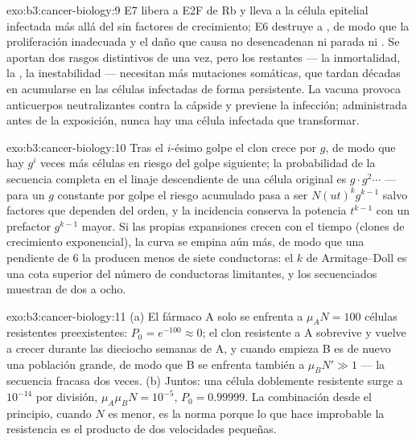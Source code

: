 \begin{solution}{exo:b3:cancer-biology:9}
E7 libera a E2F de Rb y lleva a la célula epitelial infectada más allá
del  sin factores de crecimiento; E6 destruye a ,
de modo que la proliferación inadecuada y el daño que causa no
desencadenan ni parada ni . Se aportan dos rasgos distintivos de
una vez, pero los restantes --- la inmortalidad, la , la
inestabilidad --- necesitan más mutaciones somáticas, que tardan décadas
en acumularse en las células infectadas de forma persistente. La vacuna
provoca anticuerpos neutralizantes contra la cápside y previene la
infección; administrada antes de la exposición, nunca hay una célula
infectada que transformar.
\end{solution}

\begin{solution}{exo:b3:cancer-biology:10}
Tras el $i$-ésimo golpe el clon crece por $g$, de modo que hay $g^{i}$
veces más células en riesgo del golpe siguiente; la probabilidad de la
secuencia completa en el linaje descendiente de una célula original es
$g\cdot g^{2}\cdots$ --- para un $g$ constante por golpe el riesgo
acumulado pasa a ser $N(ut)^{k}
g^{k-1}$ salvo factores que dependen del orden, y la incidencia conserva
la potencia $t^{k-1}$ con un prefactor $g^{k-1}$ mayor. Si las propias
expansiones crecen con el tiempo (clones de crecimiento exponencial), la
curva se empina aún más, de modo que una pendiente de $6$ la producen
menos de siete conductoras: el $k$ de Armitage--Doll es una cota superior
del número de conductoras limitantes, y los  secuenciados muestran
de dos a ocho.
\end{solution}

\begin{solution}{exo:b3:cancer-biology:11}
(a) El fármaco A solo se enfrenta a $\mu_{A}N = 100$ células resistentes
preexistentes: $P_{0} = e^{-100} \approx 0$; el clon resistente a A
sobrevive y vuelve a crecer durante las dieciocho semanas de A, y cuando
empieza B es de nuevo una población grande, de modo que B se enfrenta
también a $\mu_{B}N' \gg 1$ --- la secuencia fracasa dos veces.
(b) Juntos: una célula doblemente resistente surge a $10^{-14}$ por
división, $\mu_{A}\mu_{B}N = 10^{-5}$, $P_{0} =
0.99999$. La combinación desde el principio, cuando $N$ es menor, es la
norma porque lo que hace improbable la resistencia es el producto de dos
velocidades pequeñas.
\end{solution}

